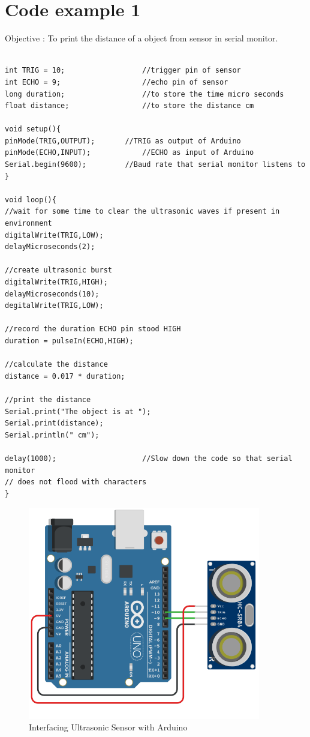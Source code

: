 \section{\textbf{Code example 1}}
Objective : To print the distance of a object from sensor in serial monitor. \\
\vspace{0.2cm}
\begin{lstlisting}[style=CStyle]

int TRIG = 10;					//trigger pin of sensor
int ECHO = 9;					//echo pin of sensor
long duration;					//to store the time micro seconds
float distance;					//to store the distance cm

void setup(){
pinMode(TRIG,OUTPUT);		//TRIG as output of Arduino
pinMode(ECHO,INPUT);			//ECHO as input of Arduino
Serial.begin(9600);			//Baud rate that serial monitor listens to
}

void loop(){
//wait for some time to clear the ultrasonic waves if present in environment
digitalWrite(TRIG,LOW);
delayMicroseconds(2);

//create ultrasonic burst
digitalWrite(TRIG,HIGH);
delayMicroseconds(10);
degitalWrite(TRIG,LOW);

//record the duration ECHO pin stood HIGH
duration = pulseIn(ECHO,HIGH);

//calculate the distance
distance = 0.017 * duration;

//print the distance
Serial.print("The object is at ");
Serial.print(distance);
Serial.println(" cm");

delay(1000);					//Slow down the code so that serial monitor
// does not flood with characters
}
\end{lstlisting}
\vspace{0.5cm
}
\begin{figure}[h!]	
	\centering
	\includegraphics[width=4in]{Chapters/images/ultraSonic_circuit1.png}
    \caption{Interfacing Ultrasonic Sensor with Arduino}
\end{figure}
\vspace{0.5cm}


